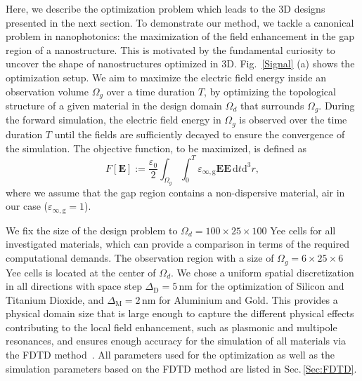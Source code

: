 \documentclass[aps,prl,twocolumn,superscriptaddress,longbibliography]{revtex4-1}
\begin{document}
Here, we describe the optimization problem which leads to the 3D designs presented in the next section.
To demonstrate our method, we tackle a canonical problem in nanophotonics: the maximization of the field enhancement in the gap region of a nanostructure. This is motivated by the fundamental curiosity to uncover the shape of nanostructures optimized in 3D.
Fig.~\ref{Signal} (a) shows the optimization setup. 
We aim to maximize the electric field energy inside an observation volume $\Omega_{g}$ over a time duration $T$, by optimizing the topological structure of a given material in the design domain $\Omega_{d}$ that surrounds $\Omega_{g}$. 
During the forward simulation, the electric field energy in $\Omega_{g}$ is observed over the time duration $T$ until the fields are sufficiently decayed to ensure the convergence of the simulation.
The objective function, to be maximized, is defined as
\begin{equation}\label{Eq:Objective_analyitically_enhancement}
F[\mathbf{E}]:= \frac{\varepsilon_{0}}{2}\int_{\Omega_{g}}\int_{0}^{T} \varepsilon_{\infty, \mathrm{g}}\mathbf{E}\mathbf{E}\, \mathrm{d}t \mathrm{d}^{3}r,
\end{equation}
where we assume that the gap region contains a non-dispersive material, air in our case ($\varepsilon_{\infty, \mathrm{g}} = 1$). 

We fix the size of the design problem to $\Omega_{d}=100 \times 25 \times 100$ Yee cells for all investigated materials, which can provide a comparison in terms of the required computational demands. 
The observation region with a size of $\Omega_{g}=6 \times 25 \times 6$ Yee cells is located at the center of $\Omega_{d}$.
We chose a uniform spatial discretization in all directions with space step $\Delta_{\mathrm{D}}=5$\,nm for the optimization of Silicon and Titanium Dioxide, and $\Delta_{\mathrm{M}}=2$\,nm for Aluminium and Gold. 
This provides a physical domain size that is large enough to capture the different physical effects contributing to the local field enhancement, such as plasmonic and multipole resonances, and ensures enough accuracy for the simulation of all materials via the FDTD method~\cite{convergence}. 
All parameters used for the optimization as well as the simulation parameters based on the FDTD method are listed in Sec.\,\ref{Sec:FDTD}.\par
\end{document}

